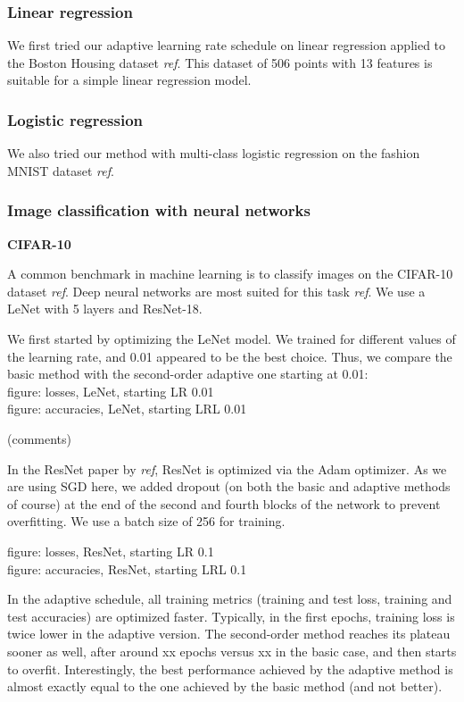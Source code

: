 \documentclass{article}
\begin{document}
  \subsubsection{Linear regression}
  
  We first tried our adaptive learning rate schedule on linear regression applied to the Boston Housing dataset \emph{ref}. This dataset of 506 points with 13 features is suitable for a simple linear regression model. 
  
  \subsubsection{Logistic regression}
  
  We also tried our method with multi-class logistic regression on the fashion MNIST dataset \emph{ref}. 
  
  \subsubsection{Image classification with neural networks}
  
  \textbf{CIFAR-10}
  
  A common benchmark in machine learning is to classify images on the CIFAR-10 dataset \emph{ref}. Deep neural networks are most suited for this task \emph{ref}. We use a LeNet with 5 layers and ResNet-18. 
  
  We first started by optimizing the LeNet model. We trained for different values of the learning rate, and 0.01 appeared to be the best choice. Thus, we compare the basic method with the second-order adaptive one starting at 0.01:\\
  
  figure: losses, LeNet, starting LR 0.01\\
  figure: accuracies, LeNet, starting LRL 0.01

  (comments)
  
  In the ResNet paper by \emph{ref}, ResNet is optimized via the Adam optimizer. As we are using SGD here, we added dropout (on both the basic and adaptive methods of course) at the end of the second and fourth blocks of the network to prevent overfitting. We use a batch size of 256 for training.
  
  figure: losses, ResNet, starting LR 0.1\\
  figure: accuracies, ResNet, starting LRL 0.1
  
  In the adaptive schedule, all training metrics (training and test loss, training and test accuracies) are optimized faster. Typically, in the first epochs, training loss is twice lower in the adaptive version. The second-order method reaches its plateau sooner as well, after around xx epochs versus xx in the basic case, and then starts to overfit. Interestingly, the best performance achieved by the adaptive method is almost exactly equal to the one achieved by the basic method (and not better). 
  
\end{document}
